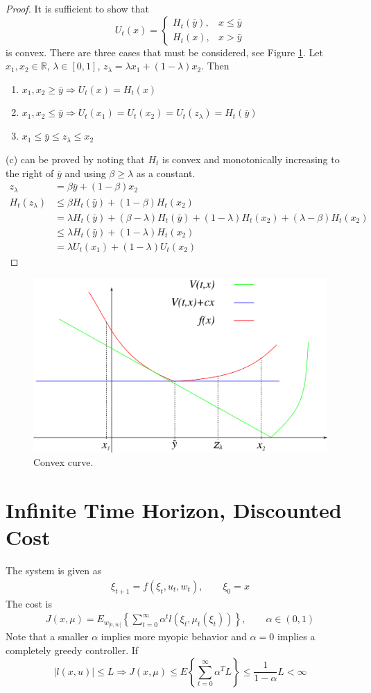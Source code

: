 \begin{proof}
It is sufficient to show that
$$U_t(x) = \begin{cases} H_t(\bar{y}), & x\leq\bar{y} \\ H_t(x), & x>\bar{y} \end{cases}$$
is convex. There are three cases that must be considered, see Figure \ref{fig:06curve}. Let $x_1,x_2\in\mathbb{R}$, $\lambda\in[0,1]$, $z_\lambda = \lambda x_1 + (1-\lambda)x_2$. Then
\begin{enumerate}
\item $x_1,x_2\geq\bar{y} \Rightarrow U_t(x) = H_t(x)$
\item $x_1,x_2\leq\bar{y} \Rightarrow U_t(x_1) = U_t(x_2) = U_t(z_\lambda) = H_t(\bar{y})$
\item $x_1\leq\bar{y}\leq z_\lambda\leq x_2$
\end{enumerate}
(c) can be proved by noting that $H_t$ is convex and monotonically increasing to the right of $\bar{y}$ and using $\beta\geq\lambda$ as a constant.
\begin{align*}
z_\lambda &= \beta\bar{y} + (1-\beta)x_2 \\
H_t(z_\lambda) &\leq \beta H_t(\bar{y})+(1-\beta)H_t(x_2) \\
&= \lambda H_t(\bar{y})+(\beta-\lambda)H_t(\bar{y}) + (1-\lambda)H_t(x_2) + (\lambda-\beta)H_t(x_2) \\
&\leq \lambda H_t(\bar{y}) + (1-\lambda)H_t(x_2) \\
&= \lambda U_t(x_1) + (1-\lambda)U_t(x_2)
\end{align*}
\end{proof}

\begin{figure}[ht!]
	\centering
	\includegraphics[width=.5\textwidth]{images/06curve}
	\caption{Convex curve.}
	\label{fig:06curve}
\end{figure}

\section{Infinite Time Horizon, Discounted Cost}
The system is given as
\begin{align*}
\xi_{t+1} = f(\xi_t,u_t,w_t), \qquad \xi_0 = x
\end{align*}
The cost is
\begin{align*}
J(x,\mu) = E_{w_{]0,\infty[}}\left\lbrace\sum_{t=0}^\infty \alpha^tl(\xi_t,\mu_t(\xi_t))\right\rbrace, \qquad \alpha\in(0,1)
\end{align*}
Note that a smaller $\alpha$ implies more myopic behavior and $\alpha=0$ implies a completely greedy controller. If
$$|l(x,u)|\leq L \Rightarrow J(x,\mu)\leq E\left\lbrace\sum_{t=0}^\infty \alpha^TL\right\rbrace \leq \frac{1}{1-\alpha}L<\infty$$


